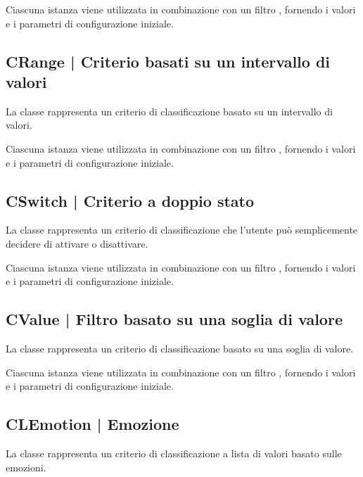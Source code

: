 \documentclass[10pt,a4paper,headinclude,footinclude,hidelinks]{scrreprt} %
\begin{document}
	Ciascuna istanza viene utilizzata in combinazione con un filtro \textit{}, fornendo i valori e i parametri di configurazione iniziale.

	\subsection[CRange]{CRange | Criterio basati su un intervallo di valori}
	\label{sec:stage:design:model.criteria:range-criterion}
	La classe \textit{} rappresenta un criterio di classificazione basato su un intervallo di valori.

	Ciascuna istanza viene utilizzata in combinazione con un filtro \textit{}, fornendo i valori e i parametri di configurazione iniziale.

	\subsection[CSwitch]{CSwitch | Criterio a doppio stato}
	\label{sec:stage:design:model.criteria:switch-criterion}
	La classe \textit{} rappresenta un criterio di classificazione che l'utente può semplicemente decidere di attivare o disattivare.

	Ciascuna istanza viene utilizzata in combinazione con un filtro \textit{}, fornendo i valori e i parametri di configurazione iniziale.

	\subsection[CValue]{CValue | Filtro basato su una soglia di valore}
	\label{sec:stage:design:model.criteria:value-criterion}
	La classe \textit{} rappresenta un criterio di classificazione basato su una soglia di valore.

	Ciascuna istanza viene utilizzata in combinazione con un filtro \textit{}, fornendo i valori e i parametri di configurazione iniziale.

	\subsection[CLEmotion]{CLEmotion | Emozione}
	\label{sec:stage:design:model.criteria:emotion}
	La classe \textit{} rappresenta un criterio di classificazione a lista di valori basato sulle emozioni.
\end{document}
